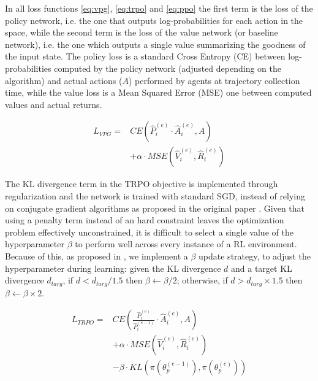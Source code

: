 \documentclass{article}
\begin{document}
In all loss functions \ref{eq:vpg}, \ref{eq:trpo} and \ref{eq:ppo} the first term is the loss of the policy network, i.e. the one that outputs log-probabilities for each action in the space, while the second term is the loss of the value network (or baseline network), i.e. the one which outputs a single value summarizing the goodness of the input state. The policy loss is a standard Cross Entropy (CE) between log-probabilities computed by the policy network (adjusted depending on the algorithm) and actual actions ($A$) performed by agents at trajectory collection time, while the value loss is a Mean Squared Error (MSE) one between computed values and actual returns.

\begin{equation}
  \label{eq:vpg}
  \begin{aligned}
    L_{VPG}={} & CE\left(\hat{P}_i^{(e)}\cdot \hat{A}_i^{(e)}, A\right) \\
    & + \alpha\cdot MSE\left(\hat{V}_i^{(e)}, \hat{R}_i^{(e)}\right)
  \end{aligned}
\end{equation}

The KL divergence term in the TRPO objective is implemented through regularization and the network is trained with standard SGD, instead of relying on conjugate gradient algorithms as proposed in the original paper \cite{trpo}. Given that using a penalty term instead of an hard constraint leaves the optimization problem effectively unconstrained, it is difficult to select a single value of the hyperparameter $\beta$ to perform well across every instance of a RL environment. Because of this, as proposed in \cite{ppo}, we implement a $\beta$ update strategy, to adjust the hyperparameter during learning: given the KL divergence $d$ and a target KL divergence $d_{targ}$, if $d<d_{targ}/1.5$ then $\beta\leftarrow\beta/2$; otherwise, if $d>d_{targ}\times 1.5$ then $\beta\leftarrow\beta\times 2$.

\begin{equation}
  \label{eq:trpo}
  \begin{aligned}
    L_{TRPO}={} & CE\left(\frac{\hat{P}_i^{(e)}}{\hat{P}_i^{(e-1)}}\cdot \hat{A}_i^{(e)}, A\right) \\
    & + \alpha\cdot MSE\left(\hat{V}_i^{(e)}, \hat{R}_i^{(e)}\right) \\
    & - \beta\cdot KL\left(\pi(\theta_p^{(e-1)}), \pi(\theta_p^{(e)})\right)
  \end{aligned}
\end{equation}
\end{document}
